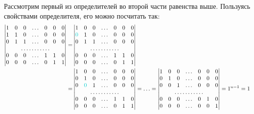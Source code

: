 \documentclass[a4paper,12pt]{article}
\theoremstyle{definition}
\theoremstyle{remark}
\theoremstyle{remark}
\begin{document}
  Рассмотрим первый из определителей во второй части равенства выше.
  Пользуясь свойствами определителя, его можно посчитать так:
  \begin{equation*}
  \begin{split}
    \begin{vmatrix}
      1 & 0 & 0 & \ldots & 0 & 0 & 0\\
      1 & 1 & 0 & \ldots & 0 & 0 & 0\\
      0 & 1 & 1 & \ldots & 0 & 0 & 0\\
      \hdotsfor{7}\\
      0 & 0 & 0 & \ldots & 1 & 1 & 0\\
      0 & 0 & 0 & \ldots & 0 & 1 & 1
    \end{vmatrix}
    = &\begin{vmatrix}
        1 & 0 & 0 & \ldots & 0 & 0 & 0\\
        \textcolor{cyanL}{0} & 1 & 0 & \ldots & 0 & 0 & 0\\
        0 & 1 & 1 & \ldots & 0 & 0 & 0\\
        \hdotsfor{7}\\
        0 & 0 & 0 & \ldots & 1 & 1 & 0\\
        0 & 0 & 0 & \ldots & 0 & 1 & 1
      \end{vmatrix}\\
    = &\begin{vmatrix}
        1 & 0 & 0 & \ldots & 0 & 0 & 0\\
        0 & 1 & 0 & \ldots & 0 & 0 & 0\\
        0 & \textcolor{cyanL}{0} & 1 & \ldots & 0 & 0 & 0\\
        \hdotsfor{7}\\
        0 & 0 & 0 & \ldots & 1 & 1 & 0\\
        0 & 0 & 0 & \ldots & 0 & 1 & 1
      \end{vmatrix}
    = \ldots
    = \begin{vmatrix}
        1 & 0 & 0 & \ldots & 0 & 0 & 0\\
        0 & 1 & 0 & \ldots & 0 & 0 & 0\\
        0 & 0 & 1 & \ldots & 0 & 0 & 0\\
        \hdotsfor{7}\\
        0 & 0 & 0 & \ldots & 0 & 1 & 0\\
        0 & 0 & 0 & \ldots & 0 & 0 & 1
      \end{vmatrix}
    = 1^{n - 1}
    = 1
  \end{split}
  \end{equation*}
  
\end{document}
